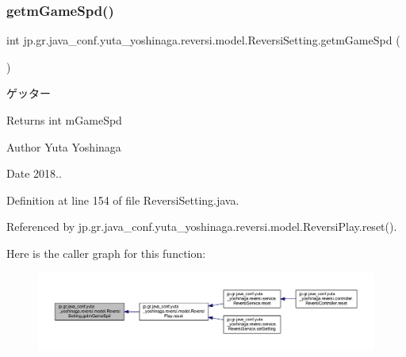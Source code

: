 \subsubsection{\texorpdfstring{getm\+Game\+Spd()}{getmGameSpd()}}
{\footnotesize\ttfamily int jp.\+gr.\+java\+\_\+conf.\+yuta\+\_\+yoshinaga.\+reversi.\+model.\+Reversi\+Setting.\+getm\+Game\+Spd (\begin{DoxyParamCaption}{ }\end{DoxyParamCaption})}



ゲッター 

\begin{DoxyReturn}{Returns}
int m\+Game\+Spd 
\end{DoxyReturn}
\begin{DoxyAuthor}{Author}
Yuta Yoshinaga 
\end{DoxyAuthor}
\begin{DoxyDate}{Date}
2018.. 
\end{DoxyDate}


Definition at line 154 of file Reversi\+Setting.\+java.



Referenced by jp.\+gr.\+java\+\_\+conf.\+yuta\+\_\+yoshinaga.\+reversi.\+model.\+Reversi\+Play.\+reset().

Here is the caller graph for this function\+:
\nopagebreak
\begin{figure}[H]
\begin{center}
\leavevmode
\includegraphics[width=350pt]{classjp_1_1gr_1_1java__conf_1_1yuta__yoshinaga_1_1reversi_1_1model_1_1_reversi_setting_a16bc06302ae7ad228d4b7436958e9f20_icgraph}
\end{center}
\end{figure}
\mbox{\label{classjp_1_1gr_1_1java__conf_1_1yuta__yoshinaga_1_1reversi_1_1model_1_1_reversi_setting_a6d13d516a1c7eb51d781286ddf5ea2fb}} 
